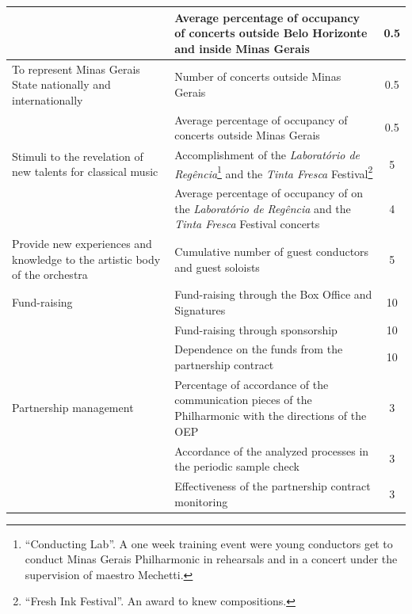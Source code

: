 \documentclass[a4paper, 12pt, openright, oneside, german, french, brazil, english]{abntex2}
\begin{document}
\begin{table}[!h]
{\begin{tabular}{p{6cm} p{7cm} c}
                             & Average percentage of occupancy of concerts outside Belo Horizonte and inside Minas Gerais & 0.5 \\
             \hline
             To represent Minas Gerais State nationally and internationally & Number of concerts outside Minas Gerais & 0.5 \\
                             & Average percentage of occupancy of concerts outside Minas Gerais & 0.5 \\
             \hline
             Stimuli to the revelation of new talents for classical music & Accomplishment of the \textit{Laboratório de Regência}\footnote{``Conducting Lab''. A one week training event were young conductors get to conduct Minas Gerais Philharmonic in rehearsals and in a concert under the supervision of maestro Mechetti.} and the \textit{Tinta Fresca} Festival\footnote{``Fresh Ink Festival''. An award to knew compositions.} & 5 \\
                             & Average percentage of occupancy of on the \textit{Laboratório de Regência} and the \textit{Tinta Fresca} Festival concerts & 4 \\
             \hline
             Provide new experiences and knowledge to the artistic body of the orchestra & Cumulative number of guest conductors and guest soloists & 5 \\
             \hline
             Fund-raising & Fund-raising through the Box Office and Signatures & 10 \\
                             & Fund-raising through sponsorship & 10 \\
                             & Dependence on the funds from the partnership contract & 10 \\
             \hline
             Partnership management & Percentage of accordance of the communication pieces of the Philharmonic with the directions of the OEP & 3 \\
                             & Accordance of the analyzed processes in the periodic sample check & 3 \\
                             & Effectiveness of the partnership contract monitoring & 3 \\
             \hline
                               
           \end{tabular}
           }
           {}
        \end{table}
       
\end{document}
